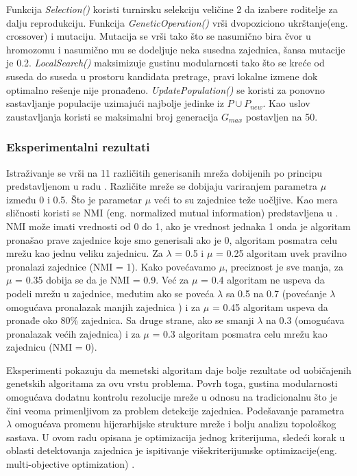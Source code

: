 \documentclass[a4paper]{article}
\begin{document}
\verb||



Funkcija \textit{Selection()} koristi turnirsku selekciju veličine 2 da izabere roditelje za dalju reprodukciju. Funkcija \textit{GeneticOperation()} vrši dvopoziciono ukrštanje(eng.  crossover) i mutaciju. Mutacija se vrši tako što se nasumično bira čvor u hromozomu i nasumično mu se dodeljuje neka susedna zajednica, šansa mutacije je 0.2. \textit{LocalSearch()} maksimizuje gustinu modularnosti tako što se kreće od suseda do suseda u prostoru kandidata pretrage, pravi lokalne izmene dok optimalno rešenje nije pronađeno. \textit{UpdatePopulation()} se koristi za ponovno sastavljanje populacije uzimajući najbolje jedinke iz $P \cup P_{new}$. Kao uslov zaustavljanja koristi se maksimalni broj generacija $G_{max}$ postavljen na 50.


\subsubsection{Eksperimentalni rezultati}

Istraživanje se vrši na 11 različitih generisanih mreža dobijenih po principu predstavljenom u radu \cite{lanci} . Različite mreže se dobijaju variranjem parametra $\mu$ između 0 i 0.5. Što je parametar  $\mu$ veći to su zajednice teže uočljive. Kao mera sličnosti koristi se NMI (eng. normalized mutual information) predstavljena u \cite{danon}. NMI može imati vrednosti od 0 do 1, ako je vrednost jednaka 1 onda je algoritam pronašao prave zajednice koje smo generisali ako je 0, algoritam posmatra celu mrežu kao jednu veliku zajednicu.
Za  $\lambda$ = 0.5 i $\mu$ = 0.25 algoritam uvek pravilno pronalazi zajednice (NMI = 1). Kako povećavamo $\mu$, preciznost je sve manja, za $\mu$ = 0.35 dobija se da je NMI = 0.9. Već za $\mu$ = 0.4 algoritam ne uspeva da podeli mrežu u zajednice, međutim ako se poveća $\lambda$ sa 0.5 na 0.7 (povećanje $\lambda$ omogućava pronalazak manjih zajednica ) i za $\mu$ = 0.45 algoritam uspeva da pronađe oko 80\% zajednica. Sa druge strane, ako se smanji  $\lambda$ na 0.3 (omogućava pronalazak većih zajednica) i za $\mu$ = 0.3 algoritam posmatra celu mrežu kao zajednicu (NMI = 0).


Eksperimenti pokazuju da memetski algoritam daje bolje rezultate od uobičajenih genetskih algoritama za ovu vrstu problema. Povrh toga, gustina modularnosti omogućava dodatnu kontrolu rezolucije mreže u odnosu na tradicionalnu što je čini  veoma primenljivom za problem detekcije zajednica. Podešavanje parametra $\lambda$ omogućava promenu  hijerarhijske strukture mreže i bolju analizu topološkog sastava. U ovom radu opisana je optimizacija jednog kriterijuma, sledeći korak u oblasti detektovanja zajednica je ispitivanje višekriterijumske optimizacije(eng. multi-objective optimization)\cite{gong} .
\end{document}
